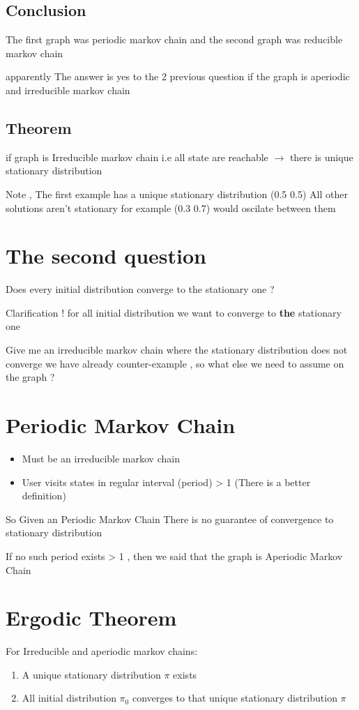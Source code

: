 \documentclass[11pt]{article}
\begin{document}
\subsection*{Conclusion}
\label{sec:org1202b03}
The first graph was periodic markov chain
and the second graph was reducible markov chain

apparently The answer is yes to the 2 previous question if
the graph is aperiodic and irreducible markov chain


\subsection*{Theorem}
\label{sec:org3e2336e}
if graph is Irreducible markov chain i.e all state are reachable \(\rightarrow\) there is unique stationary distribution

Note , The first example has a unique stationary distribution (0.5 0.5)
All other solutions aren't stationary for example (0.3 0.7) would oscilate between them


\section*{The second question}
\label{sec:org61c1f9e}
Does every initial distribution converge to the stationary one ?

Clarification ! for all initial distribution we want to converge to \textbf{the} stationary one

Give me an irreducible markov chain where the stationary distribution does not converge
we have already counter-example , so what else we need to assume on the graph ?


\section*{Periodic Markov Chain}
\label{sec:org7151029}
\begin{itemize}
\item Must be an irreducible markov chain
\item User visits states in regular interval (period) > 1
(There is a better definition)
\end{itemize}
So Given an Periodic Markov Chain There is no guarantee of convergence to stationary distribution

If no such period exists > 1 , then we said that the graph is Aperiodic Markov Chain

\section*{Ergodic Theorem}
\label{sec:org02593a4}
For Irreducible and aperiodic markov chains:
\begin{enumerate}
\item A unique stationary distribution \(\pi\) exists
\item All initial distribution \(\pi _0\) converges to that unique stationary distribution \(\pi\)
\end{enumerate}
\end{document}
